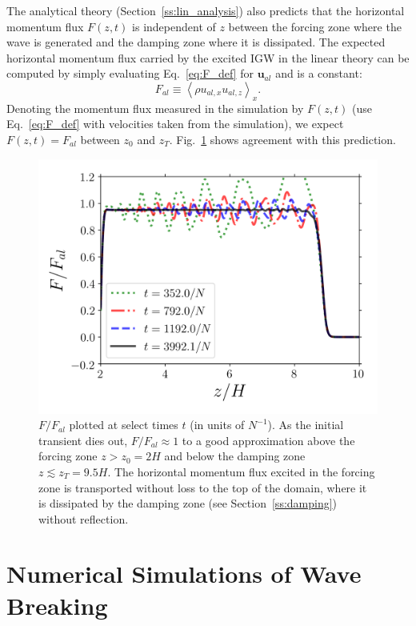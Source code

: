 \documentclass[
        fleqn,
        usenatbib,
    ]{mnras}
\newcommand*{\ev}[1]{\left\langle#1\right\rangle}
\newcommand*{\bm}[1]{\mathbf{#1}}
\begin{document}
The analytical theory (Section~\ref{ss:lin_analysis}) also predicts that the
horizontal momentum flux $F(z, t)$ is independent of $z$ between the forcing
zone where the wave is generated and the damping zone where it is dissipated.
The expected horizontal momentum flux carried by the excited IGW in the linear
theory can be computed by simply evaluating Eq.~\eqref{eq:F_def} for
$\bm{u}_{al}$ and is a constant:
\begin{equation}
    F_{al} \equiv \ev{\rho u_{al, x} u_{al, z}}_x.\label{eq:F_al}
\end{equation}
Denoting the momentum flux measured in the simulation by $F(z, t)$
(use Eq.~\eqref{eq:F_def} with velocities taken from the simulation), we expect
$F(z, t) = F_{al}$ between $z_0$ and $z_T$. Fig.~\ref{fig:lin_fluxes} shows
agreement with this prediction.
\begin{figure}
    \centering
    \includegraphics[width=0.9\columnwidth]{plots/lin_fluxes.png}
    \caption{$F/F_{al}$ plotted at select times $t$ (in units of
    $N^{-1}$). As the initial transient dies out, $F / F_{al} \approx 1$ to a
    good approximation above the forcing zone $z > z_0 = 2H$ and below the
    damping zone $z \lesssim z_T = 9.5H$. The horizontal momentum flux excited
    in the forcing zone is transported without loss to the top of the domain,
    where it is dissipated by the damping zone (see Section~\ref{ss:damping})
    without reflection.}\label{fig:lin_fluxes}
\end{figure}

\section{Numerical Simulations of Wave Breaking}\label{s:sim}
\end{document}
